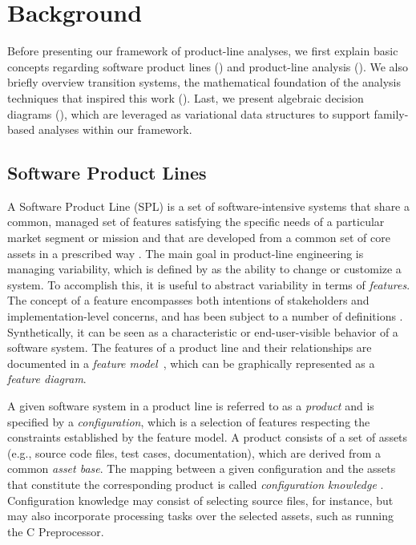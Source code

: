 \section{Background}
\label{sec:background}

Before presenting our framework of product-line analyses, we first explain basic concepts
regarding software product lines () and product-line analysis ().
We also briefly overview transition systems, the mathematical foundation of the
analysis techniques that inspired this work ().
Last, we present algebraic decision diagrams (), which are leveraged as variational data structures to support family-based analyses within our framework.

\subsection{Software Product Lines}
\label{sec:spl-foundations}

A Software Product Line (SPL) is a set of software-intensive systems that
share a common, managed set of features satisfying the specific needs of a
particular market segment or mission and that are developed from a common set
of core assets in a prescribed way \citep{ClementsSPL2001}.
The main goal in product-line engineering is managing variability,
which is defined by \citet{VanGurp2001} as the ability to change or
customize a system.
To accomplish this, it is useful to abstract variability in terms of
\emph{features}.
The concept of a feature encompasses both intentions of
stakeholders and implementation-level concerns, and has been subject to a
number of definitions \citep{FOSPL}.
Synthetically, it can be seen as a characteristic or end-user-visible
behavior of a software system.
The features of a product line and their relationships are documented in a
\emph{feature model}~\citep{FODA,CzarneckiGP2000}, which can be graphically
represented as a \emph{feature diagram}.

A given software system in a product line is referred to as a \emph{product}
and is specified by a \emph{configuration}, which is a selection of features
respecting the constraints established by the feature model.
A product consists of a set of assets (e.g., source code files,
test cases, documentation), which are derived from a common 
\emph{asset base}.
The mapping between a given configuration and the assets that constitute the
corresponding product is called \emph{configuration knowledge}
\citep{CzarneckiGP2000}.
Configuration knowledge may consist of selecting source files, for instance,
but may also incorporate processing tasks over the selected assets, such as running
the C Preprocessor.

